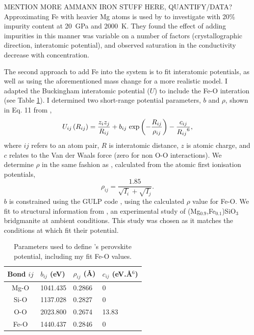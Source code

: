 MENTION MORE AMMANN IRON STUFF HERE, QUANTIFY/DATA? Approximating Fe with heavier Mg atoms is used by \citet{Ammann2014} to investigate \mgfesios with 20\% impurity content at 20~GPa and 2000~K. They found the effect of adding impurities in this manner was variable on a number of factors (crystallographic direction, interatomic potential), and observed saturation in the conductivity decrease with concentration. 

The second approach to add Fe into the \mgsios system is to fit interatomic potentials, as well as using the aforementioned mass change for a more realistic model. I adapted the \citet{Oganov2000} \mgsios Buckingham interatomic potential ($U$) to include the Fe-O interation (see Table \ref{tab:oganov_param_mod}). I determined two short-range potential parameters, $b$ and $\rho$, shown in Eq. 11 from \citet{Oganov2000},
%
\begin{equation}
U_{ij}\left ( R_{ij} \right ) = \frac{z_{i}z_{j}}{R_{ij}} + b_{ij}\ \textup{exp}\left ( - \frac{R_{ij}}{\rho_{ij}} \right ) - \frac{c_{ij}}{{R_{ij}}^{6}}, \label{og_buck}
\end{equation}
%
where $ij$ refers to an atom pair, $R$ is interatomic distance, $z$ is atomic charge, and $c$ relates to the Van der Waals force (zero for non O-O interactions). We determine $\rho$ in the same fashion as \citet{Oganov2000}, calculated from the atomic first ionisation potentials,
%
\begin{equation}
\rho_{ij} = \frac{1.85}{\sqrt{I_{i}}+\sqrt{I_{j}}}.  \label{urusov}
\end{equation}
%
$b$ is constrained using the GULP code \citep{Gale1997}, using the calculated $\rho$ value for Fe-O. We fit to structural information from \citet{Parise1990}, an experimental study of (Mg$_{0.9}$,Fe$_{0.1}$)SiO$_3$ bridgmanite at ambient conditions. This study was chosen as it matches the conditions at which \citet{Oganov2000} fit their potential. 

\begin{table}[h]
\centering
\caption{Parameters used to define \citet{Oganov2000}'s \mgsios perovskite potential, including my fit Fe-O values.} %
\label{tab:oganov_param_mod}
\begin{tabular}{clll} 
Bond $ij$ & $b_{ij}$ (eV)  & $\rho_{ij}$ (\AA) & $c_{ij}$ (eV.\AA$^{6}$) \\ \hline
Mg-O        & 1041.435        & 0.2866                 & 0                \\
Si-O          & 1137.028        & 0.2827                 & 0                \\
O-O          & 2023.800        & 0.2674                  & 13.83 \\ 
Fe-O         & 1440.437        & 0.2846                  & 0 \\ \hline       
\end{tabular}
\end{table}

